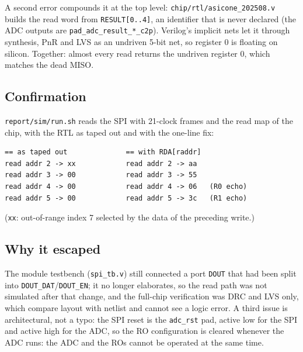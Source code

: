 \documentclass[10pt,a4paper]{article}
\begin{document}
A second error compounds it at the top level: \nolinkurl{chip/rtl/asicone_202508.v} builds the read
word from \texttt{RESULT[0..4]}, an identifier that is never declared (the ADC outputs are
\texttt{pad\_adc\_result\_*\_c2p}). Verilog's implicit nets let it through synthesis, PnR and LVS as an
undriven 5-bit net, so register 0 is floating on silicon. Together: almost every read returns the
undriven register 0, which matches the dead MISO.

\subsection{Confirmation}
\texttt{report/sim/run.sh} reads the SPI with 21-clock frames and the read map of the chip, with the RTL as
taped out and with the one-line fix:
\begin{lstlisting}[language={}]
== as taped out              == with RDA[raddr]
read addr 2 -> xx            read addr 2 -> aa
read addr 3 -> 00            read addr 3 -> 55
read addr 4 -> 00            read addr 4 -> 06   (R0 echo)
read addr 5 -> 00            read addr 5 -> 3c   (R1 echo)
\end{lstlisting}
(\texttt{xx}: out-of-range index 7 selected by the data of the preceding write.)

\subsection{Why it escaped}
The module testbench (\texttt{spi\_tb.v}) still connected a port \texttt{DOUT} that had been split into
\texttt{DOUT\_DAT}/\texttt{DOUT\_EN}; it no longer elaborates, so the read path was not simulated after
that change, and the full-chip verification was DRC and LVS only, which compare layout with netlist and
cannot see a logic error. A third issue is architectural, not a typo: the SPI reset is the
\texttt{adc\_rst} pad, active low for the SPI and active high for the ADC, so the RO configuration is
cleared whenever the ADC runs: the ADC and the ROs cannot be operated at the same time.

\end{document}
